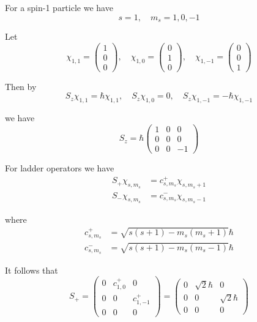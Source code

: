 


For a spin-1 particle we have
\begin{equation*}
s=1,\quad m_s=1,0,-1
\end{equation*}

Let
\begin{equation*}
\chi_{1,1}=\begin{pmatrix}1\\0\\0\end{pmatrix},
\quad
\chi_{1,0}=\begin{pmatrix}0\\1\\0\end{pmatrix},
\quad
\chi_{1,-1}=\begin{pmatrix}0\\0\\1\end{pmatrix}
\end{equation*}

Then by
\begin{equation*}
S_z\chi_{1,1}=\hbar\chi_{1,1},
\quad
S_z\chi_{1,0}=0,
\quad
S_z\chi_{1,-1}=-\hbar\chi_{1,-1}
\end{equation*}

we have
\begin{equation*}
S_z=\hbar\begin{pmatrix}1&0&0\\0&0&0\\0&0&-1\end{pmatrix}
\end{equation*}

For ladder operators we have
\begin{align*}
S_+\chi_{s,m_s}&=c_{s,m_s}^+\chi_{s,m_s+1}
\\
S_-\chi_{s,m_s}&=c_{s,m_s}^-\chi_{s,m_s-1}
\end{align*}

where
\begin{align*}
c_{s,m_s}^+&=\sqrt{s(s+1)-m_s(m_s+1)}\hbar
\\
c_{s,m_s}^-&=\sqrt{s(s+1)-m_s(m_s-1)}\hbar
\end{align*}

It follows that
\begin{equation*}
S_+=\begin{pmatrix}
0 & c_{1,0}^+ & 0
\\
0 & 0 & c_{1,-1}^+
\\
0 & 0 & 0
\end{pmatrix}
=\begin{pmatrix}
0 & \sqrt2\hbar & 0
\\
0 & 0 & \sqrt2\hbar
\\
0 & 0 & 0
\end{pmatrix}
\end{equation*}

